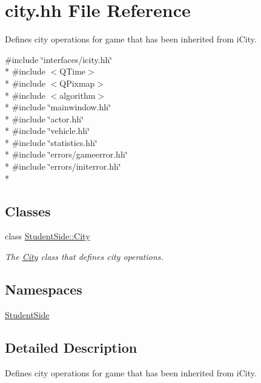 \hypertarget{city_8hh}{\section{city.\-hh File Reference}
\label{city_8hh}
}


Defines city operations for game that has been inherited from i\-City.  


{\ttfamily \#include \char`\"{}interfaces/icity.\-hh\char`\"{}}\\*
{\ttfamily \#include $<$Q\-Time$>$}\\*
{\ttfamily \#include $<$Q\-Pixmap$>$}\\*
{\ttfamily \#include $<$algorithm$>$}\\*
{\ttfamily \#include \char`\"{}mainwindow.\-hh\char`\"{}}\\*
{\ttfamily \#include \char`\"{}actor.\-hh\char`\"{}}\\*
{\ttfamily \#include \char`\"{}vehicle.\-hh\char`\"{}}\\*
{\ttfamily \#include \char`\"{}statistics.\-hh\char`\"{}}\\*
{\ttfamily \#include \char`\"{}errors/gameerror.\-hh\char`\"{}}\\*
{\ttfamily \#include \char`\"{}errors/initerror.\-hh\char`\"{}}\\*
\subsection*{Classes}
\begin{DoxyCompactItemize}
\item 
class \hyperlink{class_student_side_1_1_city}{Student\-Side\-::\-City}
\begin{DoxyCompactList}\small\item\em The \hyperlink{class_student_side_1_1_city}{City} class that defines city operations. \end{DoxyCompactList}\end{DoxyCompactItemize}
\subsection*{Namespaces}
\begin{DoxyCompactItemize}
\item 
\hyperlink{namespace_student_side}{Student\-Side}
\end{DoxyCompactItemize}


\subsection{Detailed Description}
Defines city operations for game that has been inherited from i\-City. 